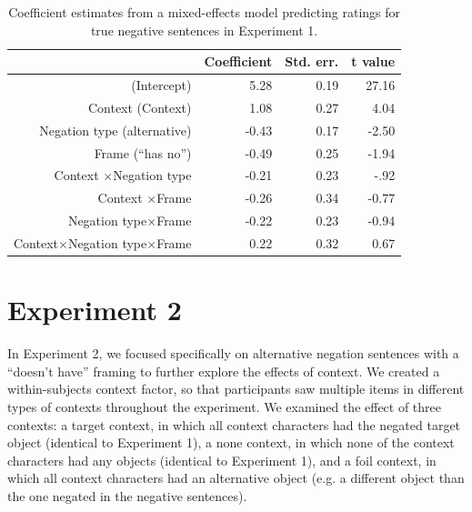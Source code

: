 \documentclass[10pt,letterpaper]{article}
\begin{document}
\begin{table}[t]
\caption{\label{tab:s1} Coefficient estimates from a mixed-effects model predicting ratings for true negative sentences in Experiment 1.}
\begin{center}
\small\addtolength{\tabcolsep}{-5pt}
\begin{tabular}{rrrr}
  \hline
 & Coefficient & Std. err. & t value \\ 
  \hline
(Intercept) & 5.28 & 0.19 & 27.16 \\ 
  Context (Context) & 1.08 & 0.27 & 4.04  \\ 
  Negation type (alternative) & -0.43 & 0.17 & -2.50 \\
  Frame (``has no'') & -0.49 & 0.25 & -1.94 \\ 
  Context $\times$Negation type & -0.21 & 0.23 & -.92 \\
  Context $\times$Frame & -0.26 & 0.34 & -0.77 \\
  Negation type$\times$Frame & -0.22 & 0.23 & -0.94 \\
  Context$\times$Negation type$\times$Frame & 0.22 & 0.32 & 0.67 \\
   \hline
\end{tabular}
\end{center}
\end{table}

\section{Experiment 2}


In Experiment 2, we focused specifically on alternative negation sentences with a ``doesn't have'' framing to further explore the effects of context.  We created a within-subjects context factor, so that participants saw multiple items in different types of contexts throughout the experiment.  We examined the effect of three contexts: a target context, in which all context characters had the negated target object (identical to Experiment 1), a none context, in which none of the context characters had any objects (identical to Experiment 1), and a foil context, in which all context characters had an alternative object (e.g. a different object than the one negated in the negative sentences). 
\end{document}
